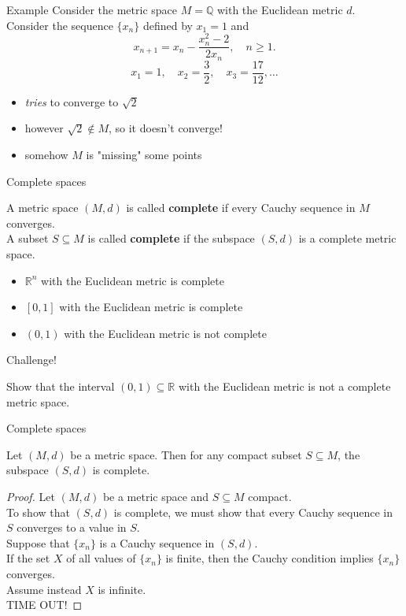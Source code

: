 \documentclass{beamer}
\begin{document}
\begin{frame}{Example}
Consider the metric space $M=\mathbb{Q}$ with the Euclidean metric $d$.\\
\pause
Consider the sequence $\{x_n\}$ defined by $x_1 = 1$ and
$$x_{n+1} = x_n - \frac{x_n^2-2}{2x_n},\quad n\geq 1.$$
\pause
$$x_1 = 1,\quad x_2 = \frac{3}{2},\quad x_3 = \frac{17}{12},\dots$$
\begin{itemize}
\pause
\item \emph{tries} to converge to $\sqrt{2}$
\pause
\item however $\sqrt{2}\notin M$, so it doesn't converge!
\pause
\item somehow $M$ is "missing" some points
\end{itemize}
\end{frame}

\begin{frame}{Complete spaces}
\begin{defn}
A metric space $(M,d)$ is called \textbf{complete} if every Cauchy sequence in $M$ converges.\\
\pause
A subset $S\subseteq M$ is called \textbf{complete} if the subspace $(S,d)$ is a complete metric space.
\end{defn}
\begin{itemize}
\pause
\item $\mathbb R^n$ with the Euclidean metric is complete
\pause
\item $[0,1]$ with the Euclidean metric is complete
\pause
\item $(0,1)$ with the Euclidean metric is not complete
\end{itemize}
\end{frame}

\begin{frame}{Challenge!}
\begin{prob}
Show that the interval $(0,1)\subseteq\mathbb{R}$ with the Euclidean metric is not a complete metric space.
\end{prob}
\end{frame}


\begin{frame}{Complete spaces}
\begin{thm}
Let $(M,d)$ be a metric space.
\pause
Then for any compact subset $S\subseteq M$, the subspace $(S,d)$ is complete.
\end{thm}
\pause
\begin{proof}
\pause
Let $(M,d)$ be a metric space and $S\subseteq M$ compact.\\
\pause
To show that $(S,d)$ is complete, we must show that every Cauchy sequence in $S$ converges to a value in $S$.\\
\pause
Suppose that $\{x_n\}$ is a Cauchy sequence in $(S,d)$.\\
\pause
If the set $X$ of all values of $\{x_n\}$ is finite, then the Cauchy condition implies $\{x_n\}$ converges.\\
\pause
Assume instead $X$ is infinite.\\
\pause
TIME OUT!
\end{proof}
\end{frame}
\end{document}
